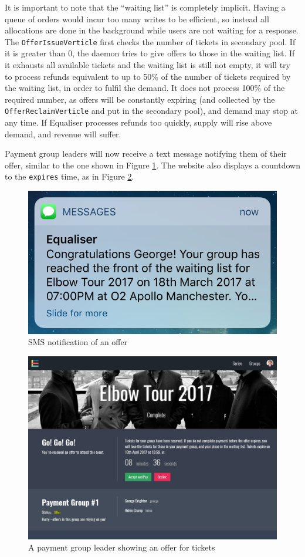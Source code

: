\documentclass[12pt,a4paper]{bhamdissertation}
\newcommand{\code}[1]{\texttt{#1}}
\begin{document}
It is important to note that the ``waiting list'' is completely implicit. Having a queue of orders would incur too many writes to be efficient, so instead all allocations are done in the background while users are not waiting for a response. The \code{OfferIssueVerticle} first checks the number of tickets in secondary pool. If it is greater than 0, the daemon tries to give offers to those in the waiting list. If it exhausts all available tickets and the waiting list is still not empty, it will try to process refunds equivalent to up to 50\% of the number of tickets required by the waiting list, in order to fulfil the demand. It does not process 100\% of the required number, as offers will be constantly expiring (and collected by the \code{OfferReclaimVerticle} and put in the secondary pool), and demand may stop at any time. If Equaliser processes refunds too quickly, supply will rise above demand, and revenue will suffer.

Payment group leaders will now receive a text message notifying them of their offer, similar to the one shown in Figure \ref{img:offer_notification}. The website also displays a countdown to the \code{expires} time, as in Figure \ref{img:offer}.

\begin{figure}[!htbp]
    \centering
    \includegraphics[width=.6\linewidth]{img/offer_notification.png}
    \caption{SMS notification of an offer}
    \label{img:offer_notification}
\end{figure}

\begin{figure}[!htbp]
    \centering
    \includegraphics[width=1\linewidth]{img/offer.png}
    \caption{A payment group leader showing an offer for tickets}
    \label{img:offer}
\end{figure}
\end{document}
